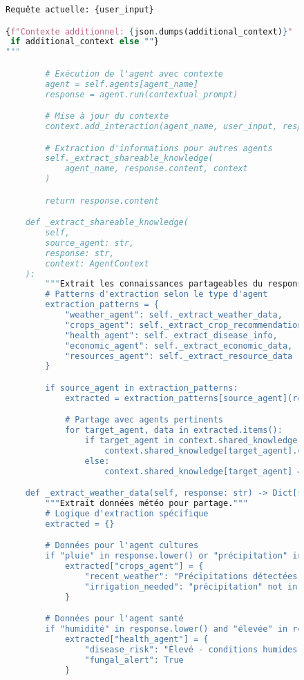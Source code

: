 \begin{figure}[H]
\begin{lstlisting}[language=Python, caption=Système de gestion du contexte inter-agents]
Requête actuelle: {user_input}

{f"Contexte additionnel: {json.dumps(additional_context)}"
 if additional_context else ""}
"""

        # Exécution de l'agent avec contexte
        agent = self.agents[agent_name]
        response = agent.run(contextual_prompt)

        # Mise à jour du contexte
        context.add_interaction(agent_name, user_input, response.content)

        # Extraction d'informations pour autres agents
        self._extract_shareable_knowledge(
            agent_name, response.content, context
        )

        return response.content

    def _extract_shareable_knowledge(
        self,
        source_agent: str,
        response: str,
        context: AgentContext
    ):
        """Extrait les connaissances partageables du response."""
        # Patterns d'extraction selon le type d'agent
        extraction_patterns = {
            "weather_agent": self._extract_weather_data,
            "crops_agent": self._extract_crop_recommendations,
            "health_agent": self._extract_disease_info,
            "economic_agent": self._extract_economic_data,
            "resources_agent": self._extract_resource_data
        }

        if source_agent in extraction_patterns:
            extracted = extraction_patterns[source_agent](response)

            # Partage avec agents pertinents
            for target_agent, data in extracted.items():
                if target_agent in context.shared_knowledge:
                    context.shared_knowledge[target_agent].update(data)
                else:
                    context.shared_knowledge[target_agent] = data

    def _extract_weather_data(self, response: str) -> Dict[str, Any]:
        """Extrait données météo pour partage."""
        # Logique d'extraction spécifique
        extracted = {}

        # Données pour l'agent cultures
        if "pluie" in response.lower() or "précipitation" in response.lower():
            extracted["crops_agent"] = {
                "recent_weather": "Précipitations détectées",
                "irrigation_needed": "précipitation" not in response.lower()
            }

        # Données pour l'agent santé
        if "humidité" in response.lower() and "élevée" in response.lower():
            extracted["health_agent"] = {
                "disease_risk": "Élevé - conditions humides",
                "fungal_alert": True
            }


\end{lstlisting}
\end{figure}
